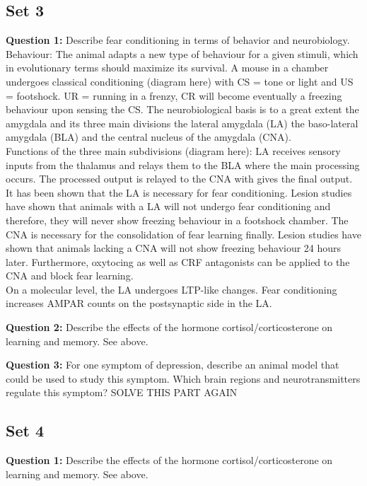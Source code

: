 \documentclass[twosided, a4paper, pt11]{article}
\begin{document}
	\subsection{Set 3}
	\textbf{Question 1:} Describe fear conditioning in terms of behavior and neurobiology.\newline
	Behaviour: The animal adapts a new type of behaviour for a given stimuli, which in evolutionary terms should maximize its survival. A mouse in a chamber undergoes classical conditioning (diagram here) with CS = tone or light and US = footshock. UR = running in a frenzy, CR will become eventually a freezing behaviour upon sensing the CS. The neurobiological basis is to a great extent the amygdala and its three main divisions the lateral amygdala (LA) the baso-lateral amygdala (BLA) and the central nucleus of the amygdala (CNA).\\
	Functions of the three main subdivisions (diagram here): LA receives sensory inputs from the thalamus and relays them to the BLA where the main processing occurs. The processed output is relayed to the CNA with gives the final output. It has been shown that the LA is necessary for fear conditioning. Lesion studies have shown that animals with a LA will not undergo fear conditioning and therefore, they will never show freezing behaviour in a footshock chamber. The CNA is necessary for the consolidation of fear learning finally. Lesion studies have shown that animals lacking a CNA will not show freezing behaviour 24 hours later. Furthermore, oxytocing as well as CRF antagonists can be applied to the CNA and block fear learning.\\
	On a molecular level, the LA undergoes LTP-like changes. Fear conditioning increases AMPAR counts on the postsynaptic side in the LA.\newline
	
	\textbf{Question 2:} Describe the effects of the hormone cortisol/corticosterone on learning and memory.\newline
	See above.\newline
	
	\textbf{Question 3:} For one symptom of depression, describe an animal model that could be used to study this symptom. Which brain regions and neurotransmitters regulate this symptom?
	SOLVE THIS PART AGAIN \newline
	
	\subsection{Set 4}
	\textbf{Question 1:} Describe the effects of the hormone cortisol/corticosterone on learning and memory.\newline
	See above.\newline
	
\end{document}
